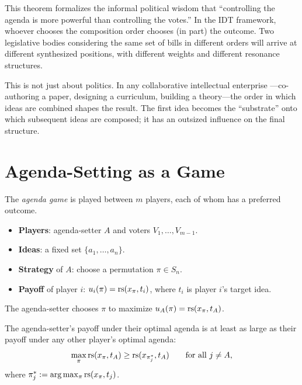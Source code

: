 \begin{interpretation}
\label{interp:agenda-power}
This theorem formalizes the informal political wisdom that ``controlling the
agenda is more powerful than controlling the votes.''  In the IDT framework,
whoever chooses the composition order chooses (in part) the outcome.  Two
legislative bodies considering the same set of bills in different orders will
arrive at different synthesized positions, with different weights and different
resonance structures.

This is not just about politics.  In any collaborative intellectual enterprise
---co-authoring a paper, designing a curriculum, building a theory---the order
in which ideas are combined shapes the result.  The first idea becomes the
``substrate'' onto which subsequent ideas are composed; it has an outsized
influence on the final structure.
\end{interpretation}


\section{Agenda-Setting as a Game}

\begin{game}
\label{game:agenda}
The \emph{agenda game} is played between $m$ players, each of whom has a
preferred outcome.
\begin{itemize}
  \item \textbf{Players}: agenda-setter $A$ and voters $V_1, \ldots, V_{m-1}$.
  \item \textbf{Ideas}: a fixed set $\{a_1, \ldots, a_n\}$.
  \item \textbf{Strategy} of $A$: choose a permutation $\pi \in S_n$.
  \item \textbf{Payoff} of player $i$: $u_i(\pi) = \mathrm{rs}(x_\pi, t_i)$, where
        $t_i$ is player $i$'s target idea.
\end{itemize}
The agenda-setter chooses $\pi$ to maximize $u_A(\pi) = \mathrm{rs}(x_\pi, t_A)$.
\end{game}

\begin{theorem}
\label{thm:agenda-advantage}
The agenda-setter's payoff under their optimal agenda is at least as large
as their payoff under any other player's optimal agenda:
\[
  \max_\pi \mathrm{rs}(x_\pi, t_A) \geq \mathrm{rs}(x_{\pi^*_j}, t_A)
  \qquad \text{for all } j \neq A,
\]
where $\pi^*_j := \arg\max_\pi \mathrm{rs}(x_\pi, t_j)$.
\end{theorem}

